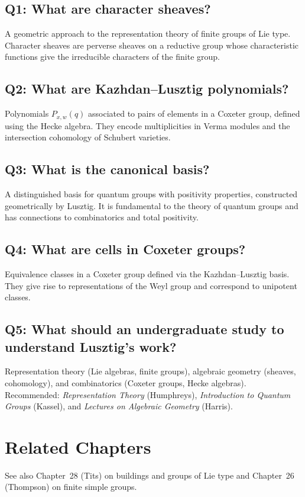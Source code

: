 \subsection*{Q1: What are character sheaves?}
A geometric approach to the representation theory of finite groups of Lie type. Character sheaves are perverse sheaves on a reductive group whose characteristic functions give the irreducible characters of the finite group.

\subsection*{Q2: What are Kazhdan--Lusztig polynomials?}
Polynomials $P_{x,w}(q)$ associated to pairs of elements in a Coxeter group, defined using the Hecke algebra. They encode multiplicities in Verma modules and the intersection cohomology of Schubert varieties.

\subsection*{Q3: What is the canonical basis?}
A distinguished basis for quantum groups with positivity properties, constructed geometrically by Lusztig. It is fundamental to the theory of quantum groups and has connections to combinatorics and total positivity.

\subsection*{Q4: What are cells in Coxeter groups?}
Equivalence classes in a Coxeter group defined via the Kazhdan--Lusztig basis. They give rise to representations of the Weyl group and correspond to unipotent classes.

\subsection*{Q5: What should an undergraduate study to understand Lusztig's work?}
Representation theory (Lie algebras, finite groups), algebraic geometry (sheaves, cohomology), and combinatorics (Coxeter groups, Hecke algebras). Recommended: \textit{Representation Theory} (Humphreys), \textit{Introduction to Quantum Groups} (Kassel), and \textit{Lectures on Algebraic Geometry} (Harris).

\section{Related Chapters}
See also Chapter~28 (Tits) on buildings and groups of Lie type and Chapter~26 (Thompson) on finite simple groups.

